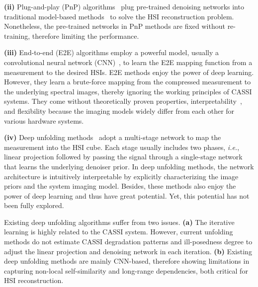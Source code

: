 \documentclass{article}
\begin{document}
\textbf{(ii)}  Plug-and-play (PnP) algorithms~\cite{pnp_3,pnp_1,pnp_2,self,zheng2021deep,yuan2021plug} plug  pre-trained denoising networks into traditional model-based methods~\cite{pnp_2,qiao2020deep} to solve the HSI reconstruction problem. Nonetheless, the pre-trained networks in PnP methods are fixed without re-training, therefore limiting the  performance.

\textbf{(iii)} End-to-end (E2E) algorithms employ a powerful model, usually a convolutional neural network (CNN)~\cite{mi_3,tsa_net,hdnet,lambda},  to learn the E2E mapping function from a measurement to the desired HSIs. E2E methods enjoy the power of deep learning. However, they learn a brute-force mapping from the compressed measurement to the underlying spectral images, thereby ignoring the working principles of CASSI systems. They come without theoretically proven properties, interpretability~\cite{Yuan_review}, and flexibility because the imaging models widely  differ from each other for various hardware systems.

\textbf{(iv)} Deep unfolding methods~\cite{dnu,hssp,gapnet,admm-net,gsm,fu2021bidirectional,herosnet} adopt a multi-stage network to map the measurement into the HSI cube. Each stage usually includes two phases, \emph{i.e.}, linear projection followed by passing the signal through a single-stage network that learns the underlying denoiser prior. In deep unfolding methods, the network architecture is intuitively interpretable by explicitly characterizing the image priors and the system imaging model. Besides, these methods also enjoy the power of deep learning and thus have great potential. Yet, this potential has not been fully explored. 

Existing deep unfolding algorithms suffer from two issues. \textbf{(a)} The iterative learning is highly related to the CASSI system. 
However, current unfolding methods do not estimate CASSI degradation patterns and ill-posedness degree  to adjust the linear projection and denoising network in each iteration. 
\textbf{(b)} Existing deep unfolding methods are mainly CNN-based, therefore showing  limitations in capturing non-local self-similarity and long-range dependencies, both critical for HSI reconstruction.  
\end{document}
